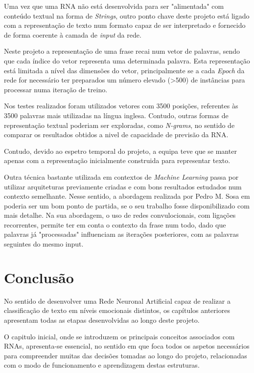 Uma vez que uma RNA não está desenvolvida para ser "alimentada" com conteúdo textual na forma de \textit{Strings}, outro ponto chave deste projeto está ligado com a representação de texto num formato capaz de ser interpretado e fornecido de forma coerente à camada de \textit{input} da rede. 

Neste projeto a representação de uma frase recai num vetor de palavras, sendo que cada índice do vetor representa uma determinada palavra. Esta representação está limitada a nível das dimensões do vetor, principalmente se a cada \textit{Epoch} da rede for necessário ter preparados um número elevado (>500) de instâncias para processar numa iteração de treino. 

Nos testes realizados foram utilizados vetores com 3500 posições, referentes às 3500 palavras mais utilizadas na língua inglesa. Contudo, outras formas de representação textual poderiam ser exploradas, como \textit{N-grams}, no sentido de comparar os resultados obtidos a nivel de capacidade de previsão da RNA. 

Contudo, devido ao espetro temporal do projeto, a equipa teve que se manter apenas com a representação inicialmente construida para representar texto.

Outra técnica bastante utilizada em contextos de \textit{Machine Learning} passa por utilizar arquiteturas previamente criadas e com bons resultados estudados num contexto semelhante. 
Nesse sentido, a abordagem realizada por Pedro M. Sosa em \cite{PedroCNN} poderia ser um bom ponto de partida, se o seu trabalho fosse disponibilizado com mais detalhe. 
Na sua abordagem, o uso de redes convulocionais, com ligações recorrentes, permite ter em conta o contexto da frase num todo, dado que palavras já "processadas" influenciam as iterações posteriores, com as palavras seguintes do mesmo input. 


\chapter{Conclusão}
\label{chp:conclusao}

No sentido de desenvolver uma Rede Neuronal Artificial capaz de realizar a classificação de texto em níveis emocionais distintos, os capítulos anteriores apresentam todas as etapas desenvolvidas ao longo deste projeto. 

O capitulo inicial, onde se introduzem os principais conceitos associados com RNAs, apresenta-se essencial, no sentido em que foca todos os aspetos necessários para compreender muitas das decisões tomadas ao longo do projeto, relacionadas com o modo de funcionamento e aprendizagem destas estruturas. 

